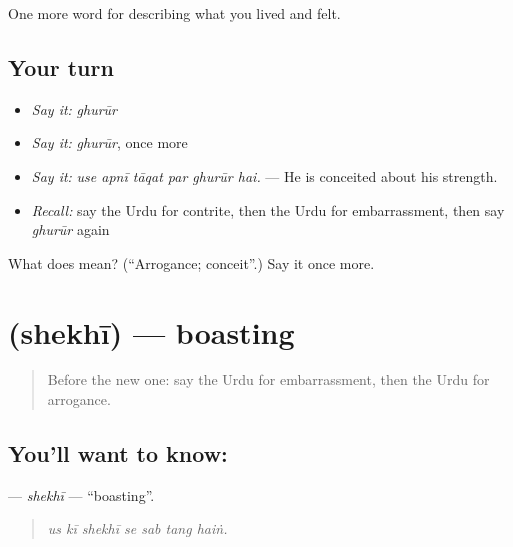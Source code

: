 \begin{grammarlens}[title={What you've built}]
One more word for describing what you lived and felt.
\end{grammarlens}

\subsection*{Your turn}
\begin{itemize}
\raggedright
  \item \emph{Say it:} \emph{ghurūr}
  \item \emph{Say it:} \emph{ghurūr}, once more
  \item \emph{Say it:} \emph{use apnī tāqat par ghurūr hai.} — He is conceited about his strength.
  \item \emph{Recall:} say the Urdu for contrite, then the Urdu for embarrassment, then say \emph{ghurūr} again
\end{itemize}

\begin{tcolorbox}[breakable,colback=teal!4,colframe=teal!35!black,title={Before you move on}]
What does  mean? (\textquotedblleft{}Arrogance; conceit\textquotedblright{}.) Say it once more.
\end{tcolorbox}
\section[\texorpdfstring{\ur{شیخی} (shekhī)}{شیخی (shekhī)}]{ (shekhī) — boasting}

\label{lesson:UR-C452-shekhi}



\begin{quote}
Before the new one: say the Urdu for embarrassment, then the Urdu for arrogance.
\end{quote}

\subsection*{You'll want to know: }
\textbf{} — \emph{shekhī} — \textquotedblleft{}boasting\textquotedblright{}.

\begin{quote}
      
\end{quote}

\begin{quote}
\emph{us kī shekhī se sab tang haiṅ.}
\end{quote}

